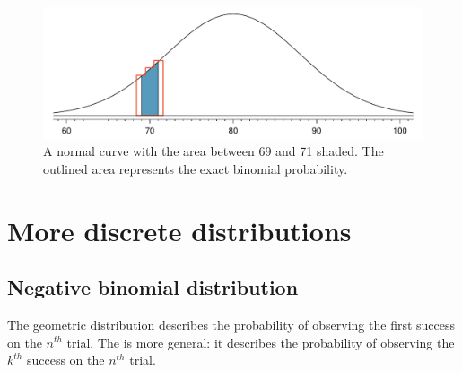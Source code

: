 
\begin{figure}%
\centering
\includegraphics[width=\textwidth]{ch_distributions/figures/normApproxToBinomFail/normApproxToBinomFail}
\caption{A normal curve with the area between 69 and 71 shaded. The outlined area represents the exact binomial probability.}
\label{normApproxToBinomFail}
\end{figure}





\section{More discrete distributions}
\label{discreteModels}

\subsection{Negative binomial distribution}
\label{negativeBinomial}


The geometric distribution describes the probability of observing the first success on the $n^{th}$ trial. The  is more general: it describes the probability of observing the $k^{th}$ success on the $n^{th}$ trial.

